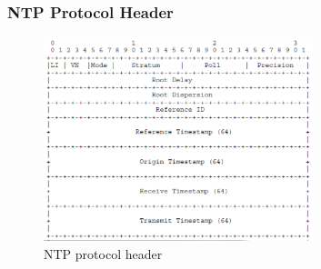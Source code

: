 \documentclass[a4paper,11pt]{article}
\begin{document}
\subsubsection{NTP Protocol Header}
\begin{figure}[H]
    \centering
    \includegraphics[width=0.7\textwidth]{./images/ntpheader.png}
    \caption{ NTP protocol header }
\end{figure}
\end{document}
